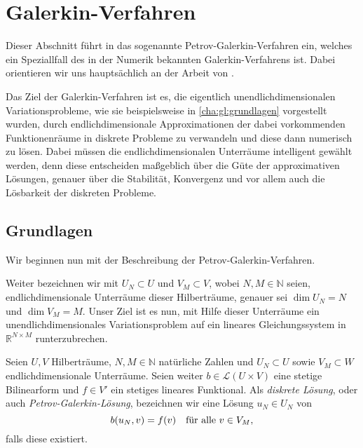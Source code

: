 \section{Galerkin-Verfahren} %
\label{sec:grb:gv:galerkin_verfahren}

Dieser Abschnitt führt in das sogenannte Petrov-Galerkin-Verfahren ein, welches ein Speziallfall des in der Numerik bekannten Galerkin-Verfahrens ist.
Dabei orientieren wir uns hauptsächlich an der Arbeit von \textcite[Section 3.1]{Nochetto:2009il}.

Das Ziel der Galerkin-Verfahren ist es, die eigentlich unendlichdimensionalen Variationsprobleme, wie sie beispielsweise in \cref{cha:gl:grundlagen} vorgestellt wurden, durch endlichdimensionale Approximationen der dabei vorkommenden Funktionenräume in diskrete Probleme zu verwandeln und diese dann numerisch zu lösen.
Dabei müssen die endlichdimensionalen Unterräume intelligent gewählt werden, denn diese entscheiden maßgeblich über die Güte der approximativen Lösungen, genauer über die Stabilität, Konvergenz und vor allem auch die Lösbarkeit der diskreten Probleme.

\subsection{Grundlagen} %
\label{sub:grb:gv:grundlagen}

Wir beginnen nun mit der Beschreibung der Petrov-Galerkin-Verfahren.

Weiter bezeichnen wir mit $U_{N} \subset U$ und $V_{M} \subset V$, wobei $N, M \in \mathbb{N}$ seien, endlichdimensionale Unterräume dieser Hilberträume, genauer sei $\dim U_{N} = N$ und $\dim V_{M} = M$.
Unser Ziel ist es nun, mit Hilfe dieser Unterräume ein unendlichdimensionales Variationsproblem auf ein lineares Gleichungssystem in $\mathbb{R}^{N \times M}$ runterzubrechen.

\begin{Definition}
\label{def:grb:gv:disrekte_loesung}
    Seien $U, V$ Hilberträume, $N, M \in \mathbb{N}$ natürliche Zahlen und $U_{N} \subset U$ sowie $V_{M} \subset W$ endlichdimensionale Unterräume.
    Seien weiter $b \in \mathcal L(U \times V)$ eine stetige Bilinearform und $f \in V'$ ein stetiges lineares Funktional.
    Als \emph{diskrete Lösung}, oder auch \emph{Petrov-Galerkin-Lösung}, bezeichnen wir eine Lösung $u_{N} \in U_{N}$ von
    \begin{equation}
        \label{eq:grb:gv:diskretes_problem}
        b(u_{N}, v) = f(v) \quad \fa v \in V_{M},
    \end{equation}
    falls diese existiert.
\end{Definition}

